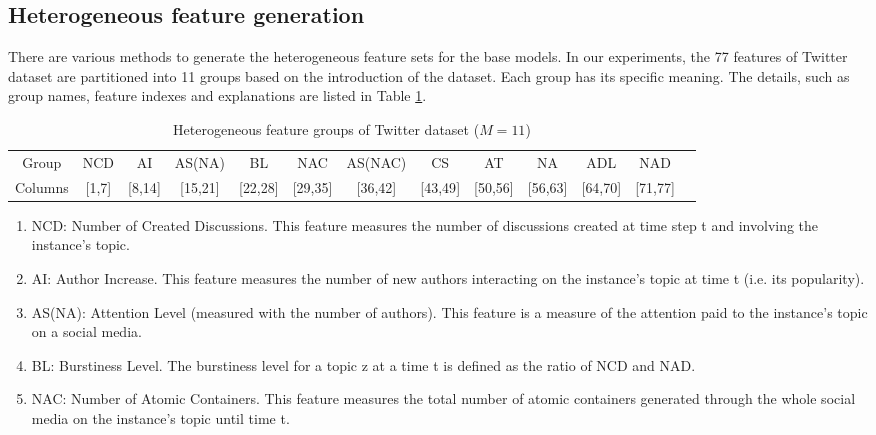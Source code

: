 \documentclass{article}
\begin{document}
\subsection{Heterogeneous feature generation}
There are various methods to generate the heterogeneous feature sets for the base models. 
In our experiments, the 77 features of Twitter dataset are partitioned into 11 groups based on the introduction of the dataset.
Each group has its specific meaning. 
The details, such as group names, feature indexes and explanations are listed in Table \ref{Table_Twitter_HFGoups}.
\begin{table}[h]
\centering
\tiny %
\caption{Heterogeneous feature groups of Twitter dataset ($M=11$)}\label{Table_Twitter_HFGoups}
\begin{threeparttable}
\begin{tabular}{ccccccccccccc}\hline
Group  &NCD &AI &AS(NA) &BL &NAC &AS(NAC) &CS &AT &NA &ADL &NAD \\
Columns &{[}1,7{]} &{[}8,14{]} &{[}15,21{]} &{[}22,28{]} &{[}29,35{]} &{[}36,42{]} &{[}43,49{]} &{[}50,56{]} &{[}56,63{]} &{[}64,70{]} &{[}71,77{]} \\ \hline
\end{tabular}
\begin{enumerate}
\item NCD: Number of Created Discussions.  This feature measures the number of discussions created at time step t and involving the instance's topic.                                
\item AI: Author Increase. This feature measures the number of new authors interacting on the instance's topic at time t (i.e. its popularity).                                  
\item AS(NA): Attention Level (measured with the number of authors). This feature is a measure of the attention paid to the instance's topic on a social media.                                              
\item BL: Burstiness Level. The burstiness level for a topic z at a time t is defined as the ratio of NCD and NAD.                                                      
\item NAC: Number of Atomic Containers. This feature measures the total number of atomic containers generated through the whole social media on the instance's topic until time t. 

\end{enumerate}
\end{threeparttable}
\end{table}
\end{document}
